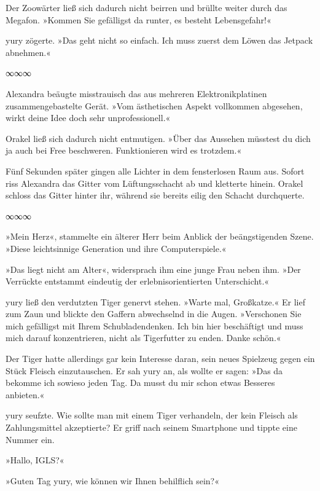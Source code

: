Der Zoowärter ließ sich dadurch nicht beirren und brüllte weiter durch das Megafon. »Kommen Sie gefälligst da runter, es besteht Lebensgefahr!«

yury zögerte. »Das geht nicht so einfach. Ich muss zuerst dem Löwen das Jetpack abnehmen.«

\begin{center}
∞∞∞
\end{center}

Alexandra beäugte misstrauisch das aus mehreren Elektronikplatinen zusammengebastelte Gerät. »Vom ästhetischen Aspekt vollkommen abgesehen, wirkt deine Idee doch sehr unprofessionell.«

Orakel ließ sich dadurch nicht entmutigen. »Über das Aussehen müsstest du dich ja auch bei Free beschweren. Funktionieren wird es trotzdem.«

Fünf Sekunden später gingen alle Lichter in dem fensterlosen Raum aus. Sofort riss Alexandra das Gitter vom Lüftungsschacht ab und kletterte hinein. Orakel schloss das Gitter hinter ihr, während sie bereits eilig den Schacht durchquerte.

\begin{center}
∞∞∞
\end{center}

»Mein Herz«, stammelte ein älterer Herr beim Anblick der beängstigenden Szene. »Diese leichtsinnige Generation und ihre Computerspiele.«

»Das liegt nicht am Alter«, widersprach ihm eine junge Frau neben ihm. »Der Verrückte entstammt eindeutig der erlebnisorientierten Unterschicht.«

yury ließ den verdutzten Tiger genervt stehen. »Warte mal, Großkatze.« Er lief zum Zaun und blickte den Gaffern abwechselnd in die Augen. »Verschonen Sie mich gefälligst mit Ihrem Schubladendenken. Ich bin hier beschäftigt und muss mich darauf konzentrieren, nicht als Tigerfutter zu enden. Danke schön.«

Der Tiger hatte allerdings gar kein Interesse daran, sein neues Spielzeug gegen ein Stück Fleisch einzutauschen. Er sah yury an, als wollte er sagen: »Das da bekomme ich sowieso jeden Tag. Da musst du mir schon etwas Besseres anbieten.«

yury seufzte. Wie sollte man mit einem Tiger verhandeln, der kein Fleisch als Zahlungsmittel akzeptierte? Er griff nach seinem Smartphone und tippte eine Nummer ein.

»Hallo, IGLS?«

»Guten Tag yury, wie können wir Ihnen behilflich sein?«

